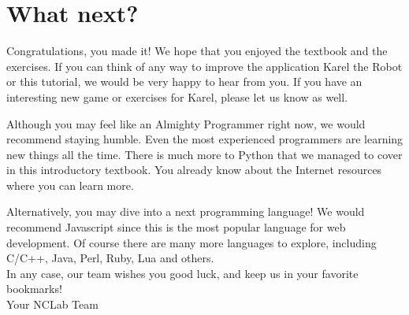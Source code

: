 \documentclass[article,A4,12pt]{llncs}
\begin{document}


\section{What next?}

Congratulations, you made it! We hope that you enjoyed the textbook and the 
exercises. If you can think of any way to improve the application Karel the 
Robot or this tutorial, we would be very happy to hear from you. If you 
have an interesting new game or exercises for Karel, please let us know as well. 

Although you may feel like an Almighty Programmer right now, we would
recommend staying humble. Even the most experienced programmers are
learning new things all the time. There is much more to Python that 
we managed to cover in this introductory textbook. You already know 
about the Internet resources where you can learn more.  

Alternatively, you may dive into a next programming language! We would 
recommend Javascript since this is the most popular language for web 
development. Of course there are many more languages to explore, including 
C/C++, Java, Perl, Ruby, Lua and others.\\

\noindent
In any case, our team wishes you good luck, and keep us in your 
favorite bookmarks! \\

\hbox{} \hfill{} Your NCLab Team
\end{document}
